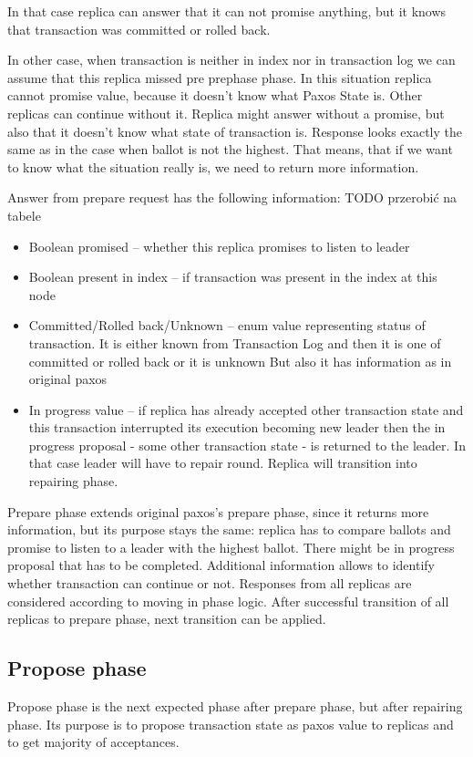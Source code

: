 In that case replica can answer that it can not promise anything, but it knows that transaction was committed or rolled back.


In other case, when transaction is neither in index nor in transaction log we can assume that this replica missed pre prephase phase. In this situation replica cannot promise value, because it doesn’t know what Paxos State is. Other replicas can continue without it. Replica might answer without a promise, but also that it doesn’t know what state of transaction is. Response looks exactly the same as in the case when ballot is not the highest. That means, that if we want to know what the situation really is, we need to return more information.


Answer from prepare request has the following information:
TODO przerobić na tabele
\begin{itemize}
\item Boolean promised -- whether this replica promises to listen to leader
\item Boolean present in index -- if transaction was present in the index at this node
\item Committed/Rolled back/Unknown -- enum value representing status of transaction. It is either known from Transaction Log and then it is one of committed or rolled back or it is unknown
But also it has information as in original paxos
\item In progress value -- if replica has already accepted other transaction state and this transaction interrupted its execution becoming new leader then the in progress proposal - some other transaction state - is returned to the leader. In that case leader will have to repair \mpt round. Replica will transition into repairing phase.
\end{itemize}


Prepare phase extends original paxos’s prepare phase, since it returns more information, but its purpose stays the same: replica has to compare ballots and promise to listen to a leader with the highest ballot. 
There might be in progress proposal that has to be completed. Additional information allows to identify whether transaction can continue or not. Responses from all replicas are considered according to moving in phase logic.
After successful transition of all replicas to prepare phase, next transition can be applied.


\subsection{Propose phase}
Propose phase is the next expected phase after prepare phase, but after repairing phase. Its purpose is to propose transaction state as paxos value to replicas and to get majority of acceptances. 

